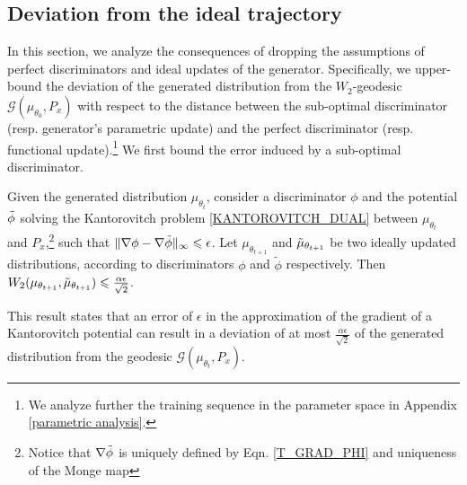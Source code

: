 \documentclass[runningheads]{llncs}
\begin{document}
\subsection{Deviation from the ideal trajectory}
In this section, we analyze the consequences of dropping the assumptions of perfect discriminators and ideal updates of the generator. Specifically, we upper-bound the deviation of the generated distribution from the $W_2$-geodesic $\mathcal{G}(\mu_{\theta_0},P_x)$ with respect to the distance between the sub-optimal discriminator (resp. generator's parametric update) and the perfect discriminator (resp. functional update).\footnote{We analyze further the training sequence in the parameter space in Appendix \ref{parametric analysis}.} We first bound the error induced by a sub-optimal discriminator.
\begin{proposition}
\normalfont
\label{unperfect_discriminator}
Given the generated distribution $\mu_{\theta_t}$, consider a discriminator $\phi$ and the potential $\Tilde{\phi}$ solving the Kantorovitch problem \eqref{KANTOROVITCH_DUAL} between $\mu_{\theta_t}$ and $P_x$,\footnote{Notice that $\nabla \Tilde{\phi}$ is uniquely defined by Eqn. \ref{T_GRAD_PHI} and uniqueness of the Monge map} such that $\|\nabla \phi - \nabla \Tilde{\phi}\|_{\infty}\leqslant \epsilon$. Let $\mu_{\theta_{t+1}}$ and $\Tilde{\mu}_{\theta_{t+1}}$ be two ideally updated distributions, according to discriminators $\phi$ and $\tilde{\phi}$ respectively. Then $W_2(\mu_{\theta_{t+1}},\Tilde{\mu}_{\theta_{t+1}})\leqslant\frac{\alpha \epsilon}{\sqrt{2}}$.  
\end{proposition}
This result states that an error of $\epsilon$ in the approximation of the gradient of a Kantorovitch potential can result in a deviation of at most $\frac{\alpha \epsilon}{\sqrt{2}}$ of the generated distribution from the geodesic $\mathcal{G}(\mu_{\theta_t},P_x)$.
\end{document}
